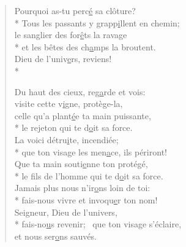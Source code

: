 \begin{verse}
Pourquoi as-tu perc\underline{é} sa clôture? \\*
Tous les passants y grapp\underline{i}llent en chemin; \\
le sanglier des for\underline{ê}ts la ravage \\*
et les bêtes des ch\underline{a}mps la broutent. \\

Dieu de l’univ\underline{e}rs, reviens! \\*

Du haut des cieux, reg\underline{a}rde et vois: \\
visite cette v\underline{i}gne, protège-la, \\
celle qu’a plant\underline{é}e ta main puissante, \\*
le rejeton qui te d\underline{o}it sa force. \\
La voici détru\underline{i}te, incendiée; \\*
que ton visage les men\underline{a}ce, ils périront! \\

Que ta main souti\underline{e}nne ton protégé, \\*
le fils de l’homme qui te d\underline{o}it sa force. \\
Jamais plus nous n’ir\underline{o}ns loin de toi: \\*
fais-nous vivre et invoqu\underline{e}r ton nom! \\

Seigneur, Dieu de l’univers, \\*
fais-no\underline{u}s revenir;~\psalmstar
que ton visage s’éclaire, \\
et nous ser\underline{o}ns sauvés. \\
\end{verse}


